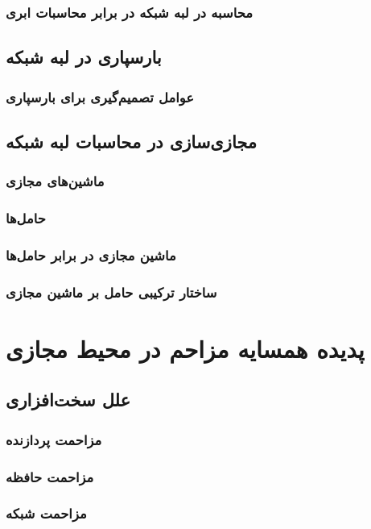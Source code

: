 \subsubsection{محاسبه در لبه شبکه در برابر محاسبات ابری}
\subsection{بارسپاری در لبه شبکه}
\subsubsection{عوامل تصمیم‌گیری برای بارسپاری}
\subsection{مجازی‌سازی در محاسبات لبه شبکه}
\subsubsection{ماشین‌های مجازی}
\subsubsection{حامل‌ها}
\subsubsection{ماشین مجازی در برابر حامل‌ها}
\subsubsection{ساختار ترکیبی حامل بر ماشین مجازی}

\section{پدیده همسایه مزاحم در محیط مجازی}
\subsection{علل سخت‌افزاری}
\subsubsection{مزاحمت پردازنده}
\subsubsection{مزاحمت حافظه}
\subsubsection{مزاحمت شبکه}
